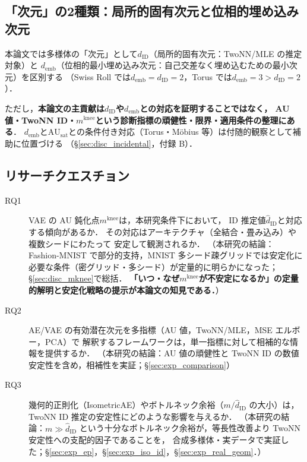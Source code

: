 \documentclass[11pt,a4paper]{jsarticle}
\newcommand{\dID}{d_{\mathrm{ID}}}
\newcommand{\AUsat}{\mathrm{AU}_{\mathrm{sat}}}
\newcommand{\mknee}{m^{\mathrm{knee}}}
\newcommand{\demb}{d_{\mathrm{emb}}}
\begin{document}
\subsection{「次元」の2種類：局所的固有次元と位相的埋め込み次元}\label{sec:intro_dim}

本論文では多様体の「次元」として$\dID$（局所的固有次元：TwoNN/MLE の推定対象）と
$\demb$（位相的最小埋め込み次元：自己交差なく埋め込むための最小次元）を区別する
（Swiss Roll では$\demb = \dID = 2$，Torus では$\demb = 3 > \dID = 2$）．

ただし，\textbf{本論文の主貢献は$\dID$や$\demb$との対応を証明することではなく，
AU 値・TwoNN ID・$\mknee$という診断指標の頑健性・限界・適用条件の整理にある}．
$\demb$と$\AUsat$との条件付き対応（Torus・Möbius 等）は付随的観察として補助に位置づける
（§\ref{sec:disc_incidental}，付録 B）．

\subsection{リサーチクエスチョン}\label{sec:intro_rq}

\begin{description}
  \item[RQ1] VAE の AU 鈍化点$\mknee$は，本研究条件下において，
             ID 推定値$\hat{d}_\mathrm{ID}$と対応する傾向があるか．
             その対応はアーキテクチャ（全結合・畳み込み）や複数シードにわたって
             安定して観測されるか．
             （本研究の結論：Fashion-MNIST で部分的支持，MNIST 多シード疎グリッドでは安定化に必要な条件（密グリッド・多シード）が定量的に明らかになった；
             §\ref{sec:disc_mknee}で総括．
             \textbf{「いつ・なぜ$\mknee$が不安定になるか」の定量的解明と安定化戦略の提示が本論文の知見である．}）
  \item[RQ2] AE/VAE の有効潜在次元を多指標（AU 値，TwoNN/MLE，MSE エルボー，PCA）で
             解釈するフレームワークは，単一指標に対して相補的な情報を提供するか．
             （本研究の結論：AU 値の頑健性と TwoNN ID の数値安定性を含め，相補性を実証；§\ref{sec:exp_comparison}）
  \item[RQ3] 幾何的正則化（IsometricAE）やボトルネック余裕（$m / \hat{d}_\mathrm{ID}$ の大小）は，
             TwoNN ID 推定の安定性にどのような影響を与えるか．
             （本研究の結論：$m \gg \hat{d}_\mathrm{ID}$ という十分なボトルネック余裕が，等長性改善より TwoNN 安定性への支配的因子であることを，
             合成多様体・実データで実証した；§\ref{sec:exp_ep}，§\ref{sec:exp_iso_id}，§\ref{sec:exp_real_geom}．）
\end{description}
\end{document}
